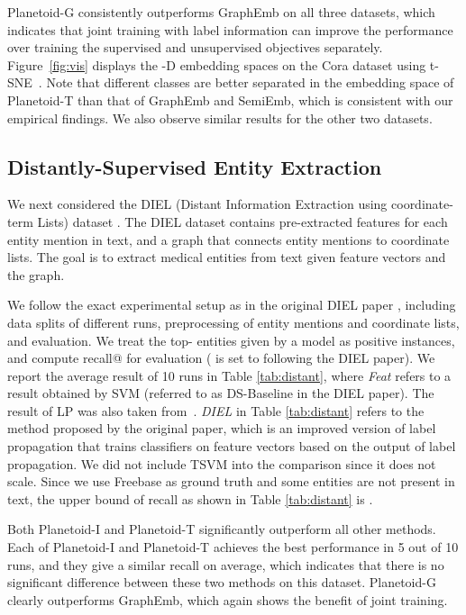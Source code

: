 Planetoid-G consistently outperforms GraphEmb on all three datasets, which indicates that joint training with label information can improve the performance over training the supervised and unsupervised objectives separately.
Figure~\ref{fig:vis} displays the -D embedding spaces on the Cora dataset
using t-SNE~\cite{van2008visualizing}. Note that  
different classes are better separated in the embedding space of Planetoid-T than that of GraphEmb and SemiEmb, which is consistent with our empirical findings. We also observe similar results for the other two datasets.  



\subsection{Distantly-Supervised Entity Extraction}


We next considered the DIEL (Distant Information Extraction using coordinate-term Lists) dataset \cite{bingimproving}.
The DIEL dataset contains pre-extracted features for each entity mention in text, and a graph that connects entity mentions to coordinate lists. The goal is to extract medical entities from text given feature vectors and the graph.

We follow the exact experimental setup as in the original DIEL paper \cite{bingimproving}, including data splits of different runs, preprocessing of entity mentions and coordinate lists, and evaluation. We treat the top- entities given by a model as positive instances, and compute recall@ for evaluation ( is set to  following the DIEL paper). We report the average result of 10 runs in Table \ref{tab:distant}, where \textit{Feat} refers to a result obtained by SVM (referred to as DS-Baseline in the DIEL paper). The result of LP was also taken from~\cite{bingimproving}. \textit{DIEL} in Table \ref{tab:distant} refers to the method proposed by the original paper, which is an improved version of label propagation that trains classifiers on feature vectors based on the output of label propagation. We did not include TSVM into the comparison since it does not scale.
Since we use Freebase as ground truth and some entities are not present in text, the upper bound of recall as shown in Table \ref{tab:distant} is .

Both Planetoid-I and Planetoid-T significantly outperform all other methods.
Each of Planetoid-I and Planetoid-T achieves the best performance in 5 out of 10 runs, and they give a similar recall on average, which indicates that there is no significant difference between these two methods on this dataset. Planetoid-G clearly outperforms GraphEmb, which again shows the benefit of joint training.


